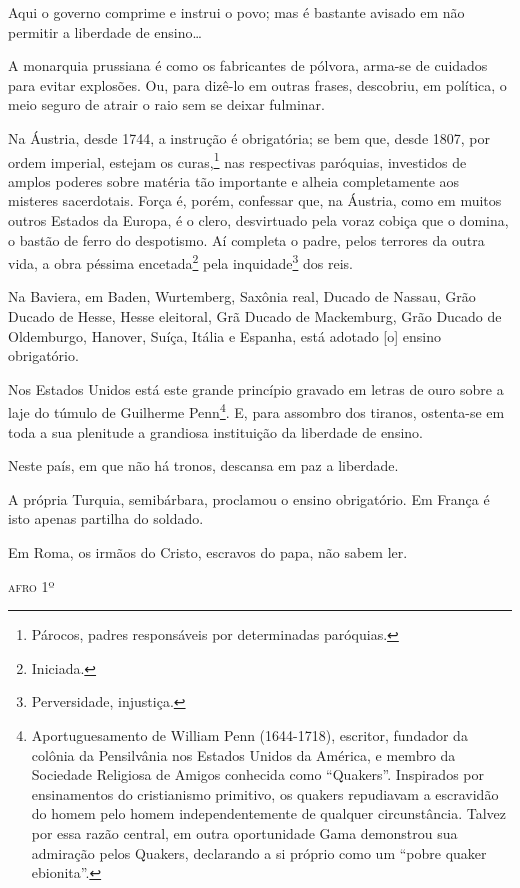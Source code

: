 Aqui o governo comprime e instrui o povo; mas é bastante avisado em não
permitir a liberdade de ensino\ldots{}

A monarquia prussiana é como os fabricantes de pólvora, arma-se de
cuidados para evitar explosões. Ou, para dizê-lo em outras frases,
descobriu, em política, o meio seguro de atrair o raio sem se deixar
fulminar.

Na Áustria, desde 1744, a instrução é obrigatória; se bem que, desde
1807, por ordem imperial, estejam os curas,\footnote{Párocos, padres
  responsáveis por determinadas paróquias.} nas respectivas paróquias,
investidos de amplos poderes sobre matéria tão importante e alheia
completamente aos misteres sacerdotais. Força é, porém, confessar que,
na Áustria, como em muitos outros Estados da Europa, é o clero,
desvirtuado pela voraz cobiça que o domina, o bastão de ferro do
despotismo. Aí completa o padre, pelos terrores da outra vida, a obra
péssima encetada\footnote{Iniciada.} pela inquidade\footnote{
  Perversidade, injustiça.} dos reis.

Na Baviera, em Baden, Wurtemberg, Saxônia real, Ducado de Nassau, Grão
Ducado de Hesse, Hesse eleitoral, Grã Ducado de Mackemburg, Grão Ducado
de Oldemburgo, Hanover, Suíça, Itália e Espanha, está adotado {[}o{]}
ensino obrigatório.

Nos Estados Unidos está este grande princípio gravado em letras de ouro
sobre a laje do túmulo de Guilherme Penn\footnote{Aportuguesamento de
  William Penn (1644-1718), escritor, fundador da colônia da Pensilvânia
  nos Estados Unidos da América, e membro da Sociedade Religiosa de
  Amigos conhecida como ``Quakers''. Inspirados por ensinamentos do
  cristianismo primitivo, os quakers repudiavam a escravidão do homem
  pelo homem independentemente de qualquer circunstância. Talvez por
  essa razão central, em outra oportunidade Gama demonstrou sua
  admiração pelos Quakers, declarando a si próprio como um ``pobre quaker
  ebionita''.}. E, para assombro dos tiranos, ostenta-se em toda a sua
plenitude a grandiosa instituição da liberdade de ensino.

Neste país, em que não há tronos, descansa em paz a liberdade.

A própria Turquia, semibárbara, proclamou o ensino obrigatório. Em
França é isto apenas partilha do soldado.

Em Roma, os irmãos do Cristo, escravos do papa, não sabem ler.
\begin{flushright}
\textsc{afro} 1º
\end{flushright}
